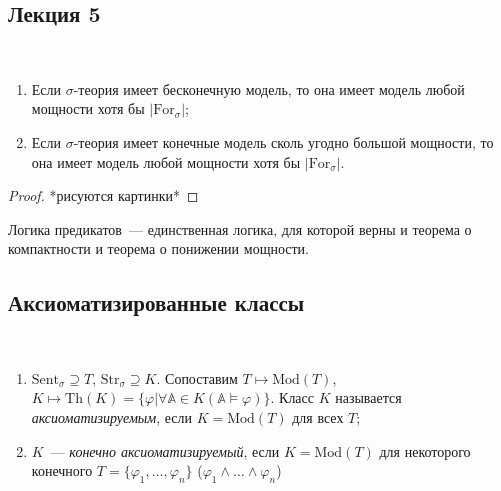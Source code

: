 \subsection{Лекция 5} 

\begin{stat} \ 
     
    \begin{enumerate}
        \item Если $\sigma$-теория имеет бесконечную модель, то она имеет модель любой мощности хотя бы $|\text{For}_\sigma|$; 
        \item Если $\sigma$-теория имеет конечные модель сколь угодно большой мощности, то она имеет модель любой мощности хотя бы $|\text{For}_\sigma|$. 
    \end{enumerate}
\end{stat}

\begin{proof}
    *рисуются картинки*
\end{proof} 

\begin{theorem}
    Логика предикатов~— единственная логика, для которой верны и теорема о компактности и теорема о понижении мощности.
\end{theorem}

\subsection{Аксиоматизированные классы}

\begin{definition} \  

    \begin{enumerate}
        \item $\text{Sent}_\sigma \supseteq T$, $\text{Str}_\sigma \supseteq K$. Сопоставим $T \mapsto \text{Mod}(T)$, $K \mapsto \text{Th}(K) = \{\varphi | \forall \mathbb{A}\in K (\mathbb{A}\models \varphi)\}$. Класс $K$ называется \textit{аксиоматизируемым}, если $K = \text{Mod}(T)$ для всех $T$; 
        \item $K$~— \textit{конечно аксиоматизируемый}, если $K = \text{Mod}(T)$ для некоторого конечного $T = \{\varphi_1, \ldots, \varphi_n\}$ ($\varphi_1 \wedge \ldots \wedge \varphi_n$)
    \end{enumerate}
\end{definition}

